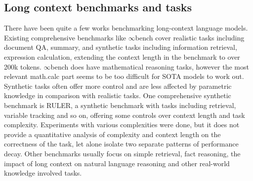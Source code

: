 \subsection{Long context benchmarks and tasks}
\label{longcontextbenchmarks} 
There have been quite a few works benchmarking long-context language models. Existing comprehensive benchmarks like $\infty$bench\citep{zhang2024inftybenchextendinglongcontext} cover realistic tasks including document QA, summary, and synthetic tasks including information retrieval, expression calculation, extending the context length in the benchmark to over 200k tokens. $\infty$bench\citep{zhang2024inftybenchextendinglongcontext} does have mathematical reasoning tasks, however the most relevant math.calc part seems to be too difficult for SOTA models to work out. Synthetic tasks often offer more control and are less affected by parametric knowledge in comparison with realistic tasks. One comprehensive synthetic benchmark is RULER\citep{hsieh2024ruler}, a synthetic benchmark with tasks including retrieval, variable tracking and so on, offering some controls over context length and task complexity. Experiments with various complexities were done, but it does not provide a quantitative analysis of complexity and context length on the correctness of the task, let alone isolate two separate patterns of performance decay. Other benchmarks usually focus on simple retrieval\citep{niah, liu2023lostmiddlelanguagemodels}, fact reasoning\citep{kuratov2024babilongtestinglimitsllms}, the impact of long context on natural language reasoning\citep{levy2024tasktokensimpactinput} and other real-world knowledge involved tasks. 

